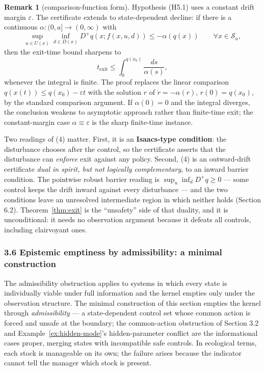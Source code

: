 \documentclass[10pt,twocolumn]{article}
\theoremstyle{definition}
\newtheorem{remark}{Remark}
\begin{document}
\begin{remark}[comparison-function form]\label{rem:comparison}
Hypothesis (H5.1) uses a constant drift margin \(\varepsilon\). The
certificate extends to state-dependent decline: if there is a continuous
\(\alpha:(0,a]\to(0,\infty)\) with
\[\sup_{u\in U(x)}\inf_{d\in D(x)} D^+q(x; f(x,u,d)) \le -\alpha(q(x)) \qquad \forall x\in\mathcal{S}_a,\]
then the exit-time bound sharpens to
\[t_{\mathrm{exit}} \le \int_0^{q(x_0)} \frac{ds}{\alpha(s)},\]
whenever the integral is finite. The proof replaces the linear comparison
\(q(x(t))\le q(x_0)-\varepsilon t\) with the solution \(r\) of
\(\dot r=-\alpha(r)\), \(r(0)=q(x_0)\), by the standard comparison
argument. If \(\alpha(0)=0\) and the integral diverges, the conclusion
weakens to asymptotic approach rather than finite-time exit; the
constant-margin case \(\alpha\equiv\varepsilon\) is the sharp finite-time
instance.
\end{remark}

Two readings of (4) matter. First, it is an \textbf{Isaacs-type
condition}: the disturbance chooses after the control, so the
certificate asserts that the disturbance can \emph{enforce} exit against
any policy. Second, (4) is an outward-drift certificate \emph{dual in
spirit, but not logically complementary}, to an inward barrier
condition. The pointwise robust barrier reading is
\(\sup_u \inf_d D^+ q \ge 0\) --- some control keeps the drift inward
against every disturbance --- and the two conditions leave an unresolved
intermediate region in which neither holds (Section 6.2). Theorem~\ref{thm:exit} is
the ``unsafety'' side of that duality, and it is unconditional: it needs
no observation argument because it defeats all controls, including
clairvoyant ones.

\subsubsection{3.6 Epistemic emptiness by admissibility: a minimal
construction}\label{epistemic-emptiness-by-admissibility-a-minimal-construction}

The admissibility obstruction applies to systems in which every state is
individually viable under full information and the kernel empties only under the observation structure.
The minimal construction of this section empties the kernel through
\emph{admissibility} --- a state-dependent control set whose common
action is forced and unsafe at the boundary; the common-action
obstruction of Section 3.2 and Example~\ref{ex:hidden-mode}'s hidden-parameter
conflict are the informational cases proper, merging states with
incompatible safe controls. In ecological terms, each stock is manageable on its own; the failure arises because the indicator cannot tell the manager which stock is present.
\end{document}
